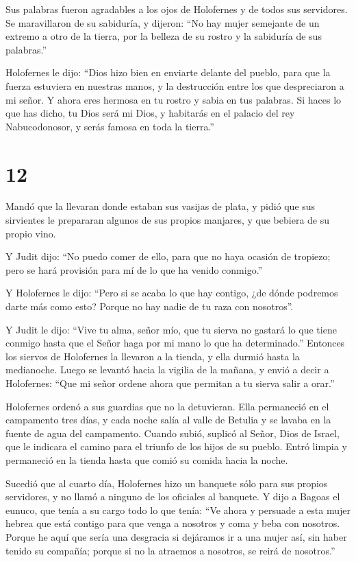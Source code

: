  Sus palabras fueron agradables a los ojos de Holofernes
y de todos sus servidores. Se maravillaron de su sabiduría, y dijeron:
 ``No hay mujer semejante de un extremo a otro de la
tierra, por la belleza de su rostro y la sabiduría de sus palabras.''

 Holofernes le dijo: ``Dios hizo bien en enviarte delante
del pueblo, para que la fuerza estuviera en nuestras manos, y la
destrucción entre los que despreciaron a mi señor.  Y
ahora eres hermosa en tu rostro y sabia en tus palabras. Si haces lo que
has dicho, tu Dios será mi Dios, y habitarás en el palacio del rey
Nabucodonosor, y serás famosa en toda la tierra.''

\hypertarget{section-11}{%
\section{12}\label{section-11}}

 Mandó que la llevaran donde estaban sus vasijas de plata,
y pidió que sus sirvientes le prepararan algunos de sus propios
manjares, y que bebiera de su propio vino.

 Y Judit dijo: ``No puedo comer de ello, para que no haya
ocasión de tropiezo; pero se hará provisión para mí de lo que ha venido
conmigo.''

 Y Holofernes le dijo: ``Pero si se acaba lo que hay
contigo, ¿de dónde podremos darte más como esto? Porque no hay nadie de
tu raza con nosotros''.

 Y Judit le dijo: ``Vive tu alma, señor mío, que tu sierva
no gastará lo que tiene conmigo hasta que el Señor haga por mi mano lo
que ha determinado.''  Entonces los siervos de Holofernes
la llevaron a la tienda, y ella durmió hasta la medianoche. Luego se
levantó hacia la vigilia de la mañana,  y envió a decir a
Holofernes: ``Que mi señor ordene ahora que permitan a tu sierva salir a
orar.''

 Holofernes ordenó a sus guardias que no la detuvieran.
Ella permaneció en el campamento tres días, y cada noche salía al valle
de Betulia y se lavaba en la fuente de agua del campamento.
 Cuando subió, suplicó al Señor, Dios de Israel, que le
indicara el camino para el triunfo de los hijos de su pueblo.
 Entró limpia y permaneció en la tienda hasta que comió su
comida hacia la noche.

 Sucedió que al cuarto día, Holofernes hizo un banquete
sólo para sus propios servidores, y no llamó a ninguno de los oficiales
al banquete.  Y dijo a Bagoas el eunuco, que tenía a su
cargo todo lo que tenía: ``Ve ahora y persuade a esta mujer hebrea que
está contigo para que venga a nosotros y coma y beba con nosotros.
 Porque he aquí que sería una desgracia si dejáramos ir a
una mujer así, sin haber tenido su compañía; porque si no la atraemos a
nosotros, se reirá de nosotros.''

